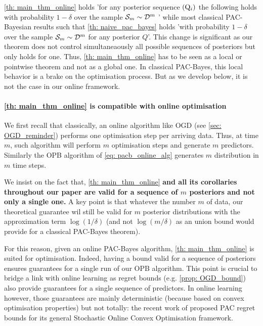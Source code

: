 \begin{noaddcontents}
\cref{th: main_thm_online} holds 'for any posterior sequence $(\mathrm{Q}_{i})$ the following holds with probability $1-\delta$ over the sample $\mathcal{S}_m\sim\mathcal{D}^m$ ' while most classical PAC-Bayesian results such that \cref{th: naive_pac_bayes} holds 'with probability $1-\delta$ over the sample $\mathcal{S}_m\sim\mathcal{D}^m$ for any posterior $Q$'. This change is significant as our theorem does not control simultaneaously all possible sequences of posteriors but only holds for one.
Thus, \cref{th: main_thm_online} has to be seen as a local or pointwise theorem and not as a global one. In classical PAC-Bayes, this local behavior is a brake on the optimisation process. But as we develop below, it is not the case in our online framework.

\paragraph{\cref{th: main_thm_online} is compatible with online optimisation}

We first recall that classically, an online algorithm like OGD (see \cref{sec: OGD_reminder}) performs one optimisation step per arriving data. Thus, at time $m$, such algorithm will perform $m$ optimisation steps and generate $m$ predictors. Similarly the OPB algorithm of \cref{eq: pacb_online_alg} generates $m$ distribution in $m$ time steps.

We insist on the fact that, \cref{th: main_thm_online} \textbf{and all its corollaries throughout our paper are valid for a sequence of $m$ posteriors and not only a single one.} A key point is that whatever the number $m$ of data, our theoretical guarantee wil still be valid for $m$ posterior distributions with the approximation term $\log(1/\delta)$ (and not $\log(m/\delta)$ as an union bound would provide for a classical PAC-Bayes theorem).

For this reason, given an online PAC-Bayes algorithm, \cref{th: main_thm_online} is suited for optimisation. Indeed, having a bound valid for a sequence of posteriors ensures guarantees for a single run of our OPB algorithm. This point is crucial to bridge a link with online learning as regret bounds (e.g. \cref{prop: OGD_bound}) also provide guarantees for a single sequence of predictors. In online learning however, those guarantees are mainly deterministic (because based on convex optimisation properties) but not totally: the recent work of \cite{wintenberger2021stochastic} proposed PAC regret bounds for its general Stochastic Online Convex Optimisation framework.


\end{noaddcontents}
